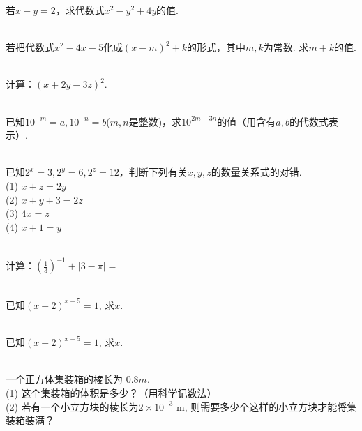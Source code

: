 \item{
    若$x+y=2$，求代数式$x^2-y^2+4y$的值.
}
\\ \\
\item{
    若把代数式$x^2-4x-5$化成$(x-m)^2+k$的形式，其中$m,k$为常数. 求$m+k$的值.
}
\\ \\
\item{
    计算：$(x+2y-3z)^2$.
}
\\ \\
\item{
    已知$10^{-m}=a, 10^{-n}=b$($m, n$是整数)，求$10^{2m-3n}$的值（用含有$a, b$的代数式表示）.
}
\\ \\
\item{
    已知$2^x=3, 2^y=6, 2^z=12$，判断下列有关$x, y, z$的数量关系式的对错.\\
    (1) $x+z=2y$\\
    (2) $x+y+3=2z$\\
    (3) $4x=z$\\
    (4) $x+1=y$
}
\\ \\
\item{
    计算：$ (\frac{1}{3})^{-1} + \lvert 3-\pi \rvert = $
}
\\ \\
\item{
    已知$(x+2)^{x+5}=1$, 求$x$.
}
\\ \\
\item{
    已知$(x+2)^{x+5}=1$, 求$x$.
}
\\ \\
\item{
    一个正方体集装箱的棱长为 $0.8 m$.\\
    (1) 这个集装箱的体积是多少？（用科学记数法）\\
    (2) 若有一个小立方块的棱长为$2\times 10^{-3} $ m, 则需要多少个这样的小立方块才能将集装箱装满？
}